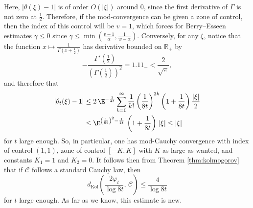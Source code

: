 \documentclass[envcountsame]{svmult}
\newcommand{\R}{\mathbb{R}}
\newcommand{\dkol}{d_\mathrm{Kol}}
\begin{document}
Here, $|\theta(\xi)-1|$ is of order $O(|\xi|)$ around $0$, since the first derivative of $\Gamma$ is not zero at $\frac{1}{2}$. Therefore, if the mod-convergence can be given a zone of control, then the index of this control will be $v=1$, which forces for Berry--Esseen estimates $\gamma\leq 0$ since $\gamma\leq \min(\frac{v-1}{\alpha},\frac{1}{w-\alpha})$.  Conversely, for any $\xi$, notice that the function $x \mapsto \frac{1}{\Gamma(x+\frac{1}{2})}$ has derivative bounded on $\R_+$ by $$-\frac{\Gamma'(\frac{1}{2})}{\left(\Gamma(\frac{1}{2})\right)^2}=1.11_- < \frac{2}{\sqrt{\pi}},$$ and therefore that
\begin{align*}
|\theta_t(\xi)-1| &\leq 2\,\E^{-\frac{1}{4t}} \sum_{k=0}^\infty \frac{1}{k!}\left(\frac{1}{8t}\right)^{2k} \left(1+\frac{1}{8t}\right) \frac{|\xi|}{2} \\
&\leq \E^{\left(\frac{1}{8t}\right)^2-\frac{1}{4t}}\,\left(1+\frac{1}{8t}\right)\,|\xi| \leq |\xi|
\end{align*}
for $t$ large enough. So, in particular, one has mod-Cauchy convergence with index of control $(1,1)$, zone of control $[-K,K]$ with $K$ as large as wanted, and constants $K_1=1$ and $K_2=0$. It follows then from Theorem \ref{thm:kolmogorov} that if $\mathcal{C}$ follows a standard Cauchy law, then
$$\dkol\left(\frac{2\varphi_t}{\log 8t},\,\mathcal{C}\right)\leq \frac{4}{\log 8t}$$
for $t$ large enough. As far as we know, this estimate is new.
\end{document}
